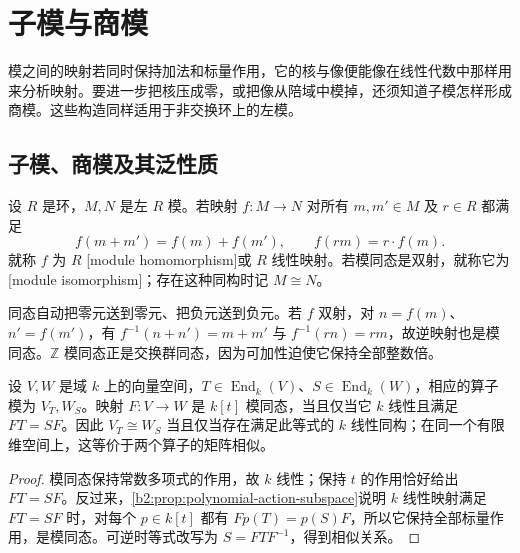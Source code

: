 
\section{子模与商模}
\label{b2:sec:0202}

模之间的映射若同时保持加法和标量作用，它的核与像便能像在线性代数中那样用来分析映射。要进一步把核压成零，或把像从陪域中模掉，还须知道子模怎样形成商模。这些构造同样适用于非交换环上的左模。


\subsection{子模、商模及其泛性质}
\label{b2:subsec:0202:01}

\begin{definition}\label{b2:def:module-homomorphism}
	设 \(R\) 是环，\(M,N\) 是左 \(R\) 模。若映射 \(f:M\to N\) 对所有 \(m,m'\in M\) 及 \(r\in R\) 都满足
	\[
		f(m+m')=f(m)+f(m'),\qquad f(rm)=r\cdot f(m).
	\]
	就称 \(f\) 为 \(R\) [module homomorphism]或 \(R\) 线性映射。若模同态是双射，就称它为[module isomorphism]；存在这种同构时记 \(M\cong N\)。
\end{definition}

同态自动把零元送到零元、把负元送到负元。若 \(f\) 双射，对 \(n=f(m)\)、\(n'=f(m')\)，有 \(f^{-1}(n+n')=m+m'\) 与 \(f^{-1}(rn)=rm\)，故逆映射也是模同态。\(\mathbb Z\) 模同态正是交换群同态，因为可加性迫使它保持全部整数倍。

\begin{proposition}\label{b2:prop:operator-module-intertwiners}
	设 \(V,W\) 是域 \(k\) 上的向量空间，\(T\in\operatorname{End}_k(V)\)、\(S\in\operatorname{End}_k(W)\)，相应的算子模为 \(V_T,W_S\)。映射 \(F:V\to W\) 是 \(k[t]\) 模同态，当且仅当它 \(k\) 线性且满足 \(FT=SF\)。因此 \(V_T\cong W_S\) 当且仅当存在满足此等式的 \(k\) 线性同构；在同一个有限维空间上，这等价于两个算子的矩阵相似。
\end{proposition}
\begin{proof}
	模同态保持常数多项式的作用，故 \(k\) 线性；保持 \(t\) 的作用恰好给出 \(FT=SF\)。反过来，\cref{b2:prop:polynomial-action-subspace}说明 \(k\) 线性映射满足 \(FT=SF\) 时，对每个 \(p\in k[t]\) 都有 \(Fp(T)=p(S)F\)，所以它保持全部标量作用，是模同态。可逆时等式改写为 \(S=FTF^{-1}\)，得到相似关系。
\end{proof}

